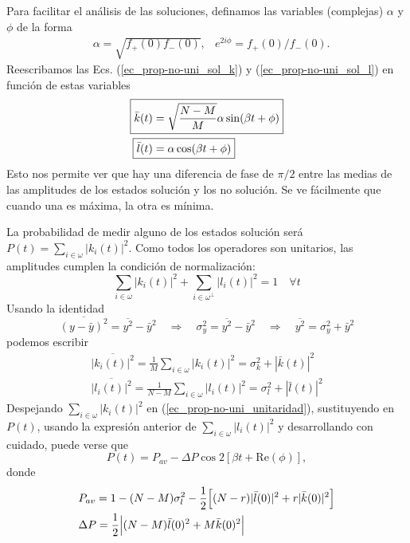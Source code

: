 \documentclass[a4paper,11pt]{article} %
\numberwithin{equation}{section}
\def\lc{\left[}
\def\rc{\right]}
\def\Lc{\Bigl[}
\def\Rc{\Bigr]}
\def\rqa{\quad \Rightarrow \quad}
\begin{document}
Para facilitar el análisis de las soluciones, definamos las variables (complejas) $\alpha$ y $\phi$ de la forma
\begin{align} \label{ec_prop-no-uni_alpha_phi}
& \alpha = \sqrt{f_{+}(0) f_{-}(0)},
& e^{2i\phi} = f_{+}(0)/f_{-}(0).
\end{align}
Reescribamos las Ecs. (\ref{ec_prop-no-uni_sol_k}) y (\ref{ec_prop-no-uni_sol_l}) en función de estas variables
\begin{align}
\Aboxed{\bar{k}(t) & = \sqrt{\frac{N-M}{M}} \alpha \sin ( \beta t + \phi)}  \label{ec_prop-no-uni_sol_k-2} \\
\Aboxed{\bar{l}(t) & = \alpha \cos (\beta t + \phi)} \label{ec_prop-no-uni_sol_l-2}
\end{align}
Esto nos permite ver que hay una diferencia de fase de $\pi/2$ entre las medias de las amplitudes de los estados solución y los no solución. Se ve fácilmente que cuando una es máxima, la otra es mínima. 

La probabilidad de medir alguno de los estados solución será $P(t) = \sum_{i \in \omega} |k_i(t)|^2$. Como todos los operadores son unitarios, las amplitudes cumplen la condición de normalización:
\begin{equation} \label{ec_prop-no-uni_unitaridad}
\sum_{i \in \omega} |k_i(t)|^2 + \sum_{i \in \omega^\perp} |l_i(t)|^2 = 1 \quad \forall t
\end{equation}
Usando la identidad
\begin{equation} 
\overline{(y-\bar{y})^2} = \overline{y^2} - \bar{y}^2 \rqa \sigma_y^2 = \overline{y^2} - \bar{y}^2 
\rqa  \overline{y^2} = \sigma_y^2  + \bar{y}^2  
\end{equation}
podemos escribir
\begin{align*}
\overline{|k_i(t)|^2} = \frac{1}{M} \sum_{i \in \omega} |k_i (t) |^2 = \sigma_k^2 + |\bar{k}(t)|^2 \\
\overline{|l_i(t)|^2} = \frac{1}{N-M} \sum_{i \in \omega} |l_i (t) |^2 = \sigma_l^2 + |\bar{l}(t)|^2 
\end{align*}
Despejando $\sum_{i \in \omega} |k_i(t)|^2$ en (\ref{ec_prop-no-uni_unitaridad}), sustituyendo en $P(t)$, usando la expresión anterior de $\sum_{i \in \omega} |l_i (t) |^2 $ y desarrollando con cuidado, puede verse que %
\begin{equation} \label{ec_prop-no-uni_Pt}
\boxed{P(t) = P_{av} - \Delta P \cos 2\lc \beta t + \text{Re}(\phi) \rc ,}
\end{equation}
donde 
\begin{align*}
& P_{av} = 1- (N-M) \sigma_l^2 - \frac{1}{2} \Lc (N-r) |\bar{l}(0)|^2 + r |\bar{k}(0)|^2 \Rc \\
& \Delta P = \frac{1}{2} \Bigl| (N-M) \bar{l}(0)^2 + M \bar{k}(0)^2 \Bigr|
\end{align*}
\end{document}
